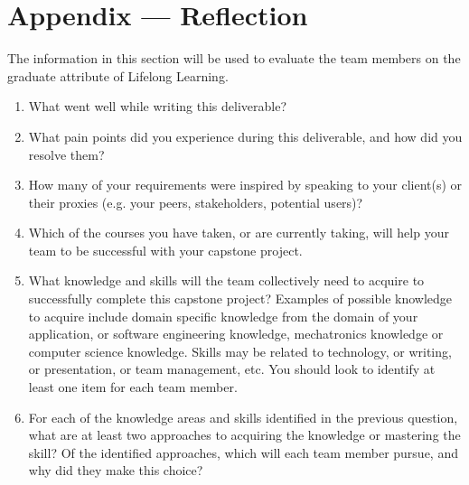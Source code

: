 \documentclass[12pt]{article}
\begin{document}
\noindent {}

\newpage{}
\section*{Appendix --- Reflection}


The information in this section will be used to evaluate the team members on the
graduate attribute of Lifelong Learning.  

\begin{enumerate}
  \item What went well while writing this deliverable? 
  \item What pain points did you experience during this deliverable, and how did
  you resolve them?
  \item How many of your requirements were inspired by speaking to your
  client(s) or their proxies (e.g. your peers, stakeholders, potential users)?
  \item Which of the courses you have taken, or are currently taking, will help
  your team to be successful with your capstone project.
  \item What knowledge and skills will the team collectively need to acquire to
  successfully complete this capstone project?  Examples of possible knowledge
  to acquire include domain specific knowledge from the domain of your
  application, or software engineering knowledge, mechatronics knowledge or
  computer science knowledge.  Skills may be related to technology, or writing,
  or presentation, or team management, etc.  You should look to identify at
  least one item for each team member.
  \item For each of the knowledge areas and skills identified in the previous
  question, what are at least two approaches to acquiring the knowledge or
  mastering the skill?  Of the identified approaches, which will each team
  member pursue, and why did they make this choice?
\end{enumerate}
\end{document}
